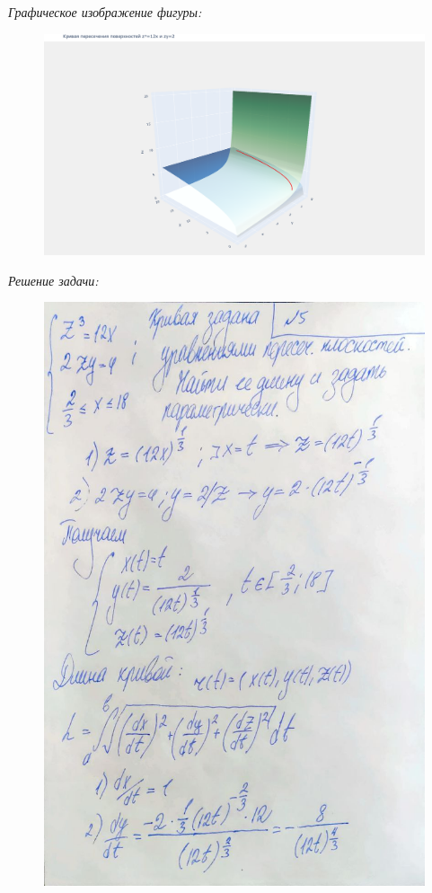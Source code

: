 \documentclass[a4paper,12pt]{article}
\begin{document}
\emph{Графическое изображение фигуры:}
\begin{figure}[H]
    \centering
    \includegraphics[width=0.9\linewidth]{../img/task5_plot.png}
    \label{fig:integral}
\end{figure}

\emph{Решение задачи:}

\begin{figure}[H]
    \centering
    \includegraphics[width=0.9\linewidth]{../img/5_1.jpg}
    \label{fig:integral}
\end{figure}
\end{document}
